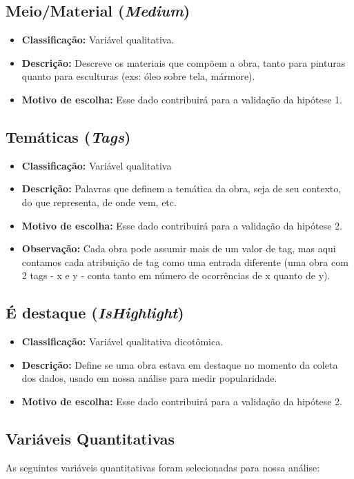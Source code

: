 \documentclass[11pt,a4paper]{article}
\begin{document}
\subsection*{Meio/Material (\textit{Medium})}
\begin{itemize}
    \item \textbf{Classificação:} Variável qualitativa.
    \item \textbf{Descrição:} Descreve os materiais que compõem a obra, tanto para pinturas quanto para esculturas (exs: óleo sobre tela, mármore).
    \item \textbf{Motivo de escolha:} Esse dado contribuirá para a validação da hipótese 1.
\end{itemize}

\subsection*{Temáticas (\textit{Tags})}
\begin{itemize}
    \item \textbf{Classificação:} Variável qualitativa
    \item \textbf{Descrição:} Palavras que definem a temática da obra, seja de seu contexto, do que representa, de onde vem, etc.
    \item \textbf{Motivo de escolha:} Esse dado contribuirá para a validação da hipótese 2.
    \item \textbf{Observação:} Cada obra pode assumir mais de um valor de tag, mas aqui contamos cada atribuição de tag como uma entrada diferente (uma obra com 2 tags - x e y - conta tanto em número de ocorrências de x quanto de y).
\end{itemize}

\subsection*{É destaque (\textit{IsHighlight})}
\begin{itemize}
    \item \textbf{Classificação:} Variável qualitativa dicotômica.
    \item \textbf{Descrição:} Define se uma obra estava em destaque no momento da coleta dos dados, usado em nossa análise para medir popularidade.
    \item \textbf{Motivo de escolha:} Esse dado contribuirá para a validação da hipótese 2.
\end{itemize}

\subsection*{Variáveis Quantitativas}
As seguintes variáveis quantitativas foram selecionadas para nossa análise:
\end{document}
